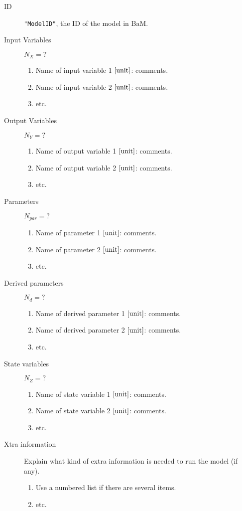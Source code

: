 \documentclass[a4paper]{article}
\begin{document}
\begin{description}
\item[ID] \texttt{"ModelID"}, the ID of the model in BaM.

\item[Input Variables] $N_X=?$
\begin{enumerate}
\item Name of input variable 1 $[\rm unit]$: comments.
\item Name of input variable 2 $[\rm unit]$: comments.
\item etc.
\end{enumerate}

\item[Output Variables] $N_Y=?$
\begin{enumerate}
\item Name of output variable 1 $[\rm unit]$: comments.
\item Name of output variable 2 $[\rm unit]$: comments.
\item etc.
\end{enumerate}

\item[Parameters] $N_{par}=?$
\begin{enumerate}
\item Name of parameter 1 $[\rm unit]$: comments.
\item Name of parameter 2 $[\rm unit]$: comments.
\item etc.
\end{enumerate}

\item[Derived parameters] $N_{d}=?$
\begin{enumerate}
\item Name of derived parameter 1 $[\rm unit]$: comments.
\item Name of derived parameter 2 $[\rm unit]$: comments.
\item etc.
\end{enumerate}

\item[State variables] $N_{Z}=?$
\begin{enumerate}
\item Name of state variable 1 $[\rm unit]$: comments.
\item Name of state variable 2 $[\rm unit]$: comments.
\item etc.
\end{enumerate}

\item[Xtra information] Explain what kind of extra information is needed to run the model (if any).
\begin{enumerate}
\item Use a numbered list if there are several items.
\item etc.
\end{enumerate}

\end{description}
\end{document}
